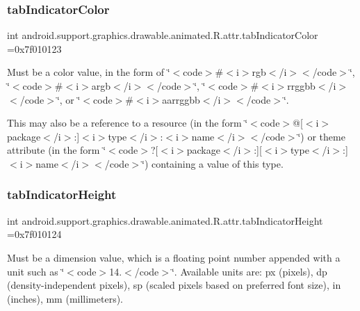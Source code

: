 \subsubsection{\texorpdfstring{tab\+Indicator\+Color}{tabIndicatorColor}}
{\footnotesize\ttfamily int android.\+support.\+graphics.\+drawable.\+animated.\+R.\+attr.\+tab\+Indicator\+Color =0x7f010123\hspace{0.3cm}{\ttfamily [static]}}

Must be a color value, in the form of \char`\"{}$<$code$>$\#$<$i$>$rgb$<$/i$>$$<$/code$>$\char`\"{}, \char`\"{}$<$code$>$\#$<$i$>$argb$<$/i$>$$<$/code$>$\char`\"{}, \char`\"{}$<$code$>$\#$<$i$>$rrggbb$<$/i$>$$<$/code$>$\char`\"{}, or \char`\"{}$<$code$>$\#$<$i$>$aarrggbb$<$/i$>$$<$/code$>$\char`\"{}. 

This may also be a reference to a resource (in the form \char`\"{}$<$code$>$@\mbox{[}$<$i$>$package$<$/i$>$\+:\mbox{]}$<$i$>$type$<$/i$>$\+:$<$i$>$name$<$/i$>$$<$/code$>$\char`\"{}) or theme attribute (in the form \char`\"{}$<$code$>$?\mbox{[}$<$i$>$package$<$/i$>$\+:\mbox{]}\mbox{[}$<$i$>$type$<$/i$>$\+:\mbox{]}$<$i$>$name$<$/i$>$$<$/code$>$\char`\"{}) containing a value of this type. \mbox{\label{classandroid_1_1support_1_1graphics_1_1drawable_1_1animated_1_1R_1_1attr_a7dc5e6d140267520c41dfc042487f1c4}} 
\subsubsection{\texorpdfstring{tab\+Indicator\+Height}{tabIndicatorHeight}}
{\footnotesize\ttfamily int android.\+support.\+graphics.\+drawable.\+animated.\+R.\+attr.\+tab\+Indicator\+Height =0x7f010124\hspace{0.3cm}{\ttfamily [static]}}

Must be a dimension value, which is a floating point number appended with a unit such as \char`\"{}$<$code$>$14.\+5sp$<$/code$>$\char`\"{}. Available units are\+: px (pixels), dp (density-\/independent pixels), sp (scaled pixels based on preferred font size), in (inches), mm (millimeters). 

